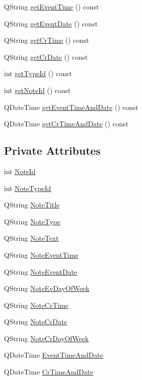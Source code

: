 \begin{DoxyCompactItemize}
Q\+String \hyperlink{classMattyNote_a879acc827b2dcc59e9ab43205a252542}{get\+Event\+Time} () const
\item 
Q\+String \hyperlink{classMattyNote_a7294508de8cdfcb923fae6b3b44ff406}{get\+Event\+Date} () const
\item 
Q\+String \hyperlink{classMattyNote_a37fbcf1e6b2edbda791240593a04b919}{get\+Cr\+Time} () const
\item 
Q\+String \hyperlink{classMattyNote_aed32bd27ebe176f3cedbc676a03f15ea}{get\+Cr\+Date} () const
\item 
int \hyperlink{classMattyNote_ad12d2758099fe96bf596ef6a7ab4abc2}{get\+Type\+Id} () const
\item 
int \hyperlink{classMattyNote_a4ee4be12260363aa33a72cb40e19d2ed}{get\+Note\+Id} () const
\item 
Q\+Date\+Time \hyperlink{classMattyNote_a1bcec093a330a5018b0eec56680d3b31}{get\+Event\+Time\+And\+Date} () const
\item 
Q\+Date\+Time \hyperlink{classMattyNote_a9d4ed47006ca671ff80037c2c0c96064}{get\+Cr\+Time\+And\+Date} () const
\end{DoxyCompactItemize}
\subsection*{Private Attributes}
\begin{DoxyCompactItemize}
\item 
int \hyperlink{classMattyNote_a15a3c21ef00e8c629aeb58025121b0a9}{Note\+Id}
\item 
int \hyperlink{classMattyNote_ad116cdf301951c8c93ee2a81a0df8647}{Note\+Type\+Id}
\item 
Q\+String \hyperlink{classMattyNote_a185f1f13eeb93acb237b9db7b4c94229}{Note\+Title}
\item 
Q\+String \hyperlink{classMattyNote_a0b45b382884fac5b651ab1ce155a2c13}{Note\+Type}
\item 
Q\+String \hyperlink{classMattyNote_ab54fa825ed3ce8081befdb0c391d682b}{Note\+Text}
\item 
Q\+String \hyperlink{classMattyNote_a3e69ae7fb7c8c616594a9647c14a192e}{Note\+Event\+Time}
\item 
Q\+String \hyperlink{classMattyNote_a9644cd6552e27c1875d83edce2469db3}{Note\+Event\+Date}
\item 
Q\+String \hyperlink{classMattyNote_a1182beac3edac3a7a7e4cdce72fc02ce}{Note\+Ev\+Day\+Of\+Week}
\item 
Q\+String \hyperlink{classMattyNote_a03208145949dfb98a99cfd9d95373418}{Note\+Cr\+Time}
\item 
Q\+String \hyperlink{classMattyNote_a3b94a4b062d2c2335f410f252210ed20}{Note\+Cr\+Date}
\item 
Q\+String \hyperlink{classMattyNote_a3776d088e67ef0181116b1cc2db3fd94}{Note\+Cr\+Day\+Of\+Week}
\item 
Q\+Date\+Time \hyperlink{classMattyNote_a7fa3236dd5812ad1a139bad8d50d28b2}{Event\+Time\+And\+Date}
\item 
Q\+Date\+Time \hyperlink{classMattyNote_a2997065dc8e32e25c98e2190b4a439b6}{Cr\+Time\+And\+Date}
\end{DoxyCompactItemize}


